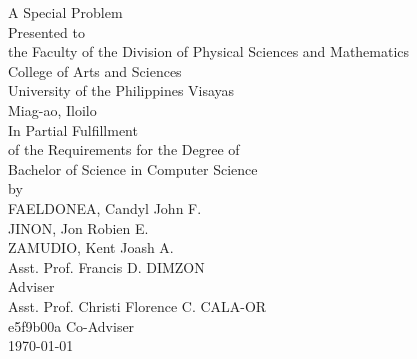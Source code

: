 \begin{titlepage}
\centering


\vspace{0.875cm}
A Special Problem\\
Presented to\\
the Faculty of the Division of Physical Sciences and Mathematics\\
College of Arts and Sciences\\
University of the Philippines Visayas\\
Miag-ao, Iloilo\\
\vspace{0.875cm}
In Partial Fulfillment\\
of the Requirements for the Degree of\\
Bachelor of Science in Computer Science\\
\vspace{1.1cm} %
by\\
\vspace{0.1cm}
FAELDONEA, Candyl John F. \\
JINON, Jon Robien  E.\\
ZAMUDIO, Kent Joash  A.\\
\vspace{0.875cm}
Asst. Prof. Francis D. DIMZON \\
Adviser\\
Asst. Prof. Christi Florence C. CALA-OR \\
e5f9b00a
Co-Adviser\\
\vspace{0.875cm}
\today
\end{titlepage}
